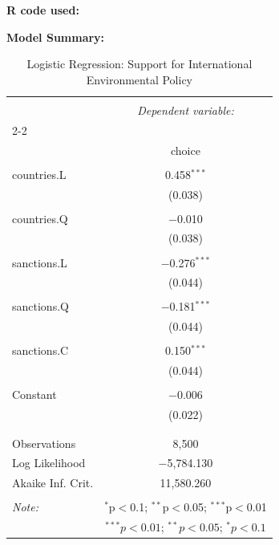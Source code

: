 \documentclass[12pt,letterpaper]{article}
\begin{document}
\noindent\textbf{R code used:}


\newpage

\noindent\textbf{Model Summary:}
\begin{table}[H] \centering 
	\caption{Logistic Regression: Support for International Environmental Policy} 
	\label{tab:model1} 
	\begin{tabular}{@{\extracolsep{5pt}}lc} 
		\\[-1.8ex]\hline 
		\hline \\[-1.8ex] 
		& \multicolumn{1}{c}{\textit{Dependent variable:}} \\ 
		\cline{2-2} 
		\\[-1.8ex] & choice \\ 
		\hline \\[-1.8ex] 
		countries.L & 0.458$^{***}$ \\ 
		& (0.038) \\ 
		& \\ 
		countries.Q & $-$0.010 \\ 
		& (0.038) \\ 
		& \\ 
		sanctions.L & $-$0.276$^{***}$ \\ 
		& (0.044) \\ 
		& \\ 
		sanctions.Q & $-$0.181$^{***}$ \\ 
		& (0.044) \\ 
		& \\ 
		sanctions.C & 0.150$^{***}$ \\ 
		& (0.044) \\ 
		& \\ 
		Constant & $-$0.006 \\ 
		& (0.022) \\ 
		& \\ 
		\hline \\[-1.8ex] 
		Observations & 8,500 \\ 
		Log Likelihood & $-$5,784.130 \\ 
		Akaike Inf. Crit. & 11,580.260 \\ 
		\hline 
		\hline \\[-1.8ex] 
		\textit{Note:}  & \multicolumn{1}{c}{$^{*}$p$<$0.1; $^{**}$p$<$0.05; $^{***}$p$<$0.01} \\ 
		& \multicolumn{1}{c}{\parbox[t]{7cm}{$^{***}p<0.01$; $^{**}p<0.05$; $^*p<0.1$}} \\ 
	\end{tabular} 
\end{table}
\end{document}
